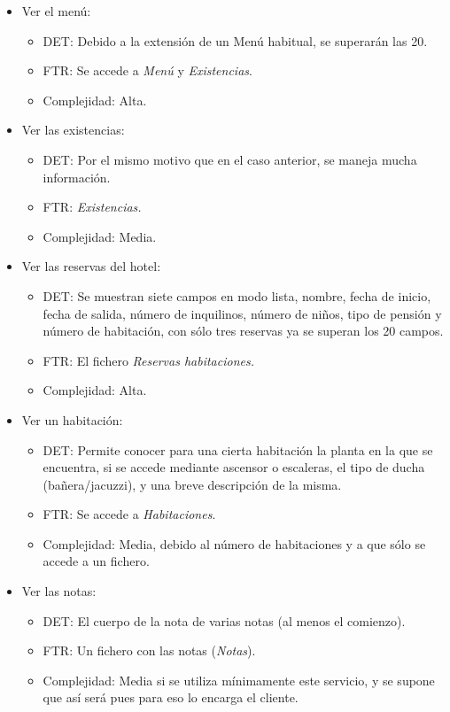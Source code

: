 \documentclass[spanish,a4paper,11pt, twoside]{report}	%
\begin{document}
\begin{itemize}
		\item{Ver el menú:} 
		\begin{itemize}
 			\item{DET:} Debido a la extensión de un Menú habitual, se superarán las 20.
			\item{FTR:} Se accede a \textit{Menú} y \textit{Existencias}.
			\item{Complejidad:} Alta.
		\end{itemize}
		\item{Ver las existencias:} 
		\begin{itemize}
 			\item{DET:} Por el mismo motivo que en el caso anterior, se maneja mucha información.
			\item{FTR:} \textit{Existencias.}
			\item{Complejidad:} Media.
		\end{itemize}
		\item{Ver las reservas del hotel:} 
		\begin{itemize}
 			\item{DET:} Se muestran siete campos en modo lista, nombre, fecha de inicio, fecha de salida, número de inquilinos, número de niños, tipo de pensión y número de habitación, con sólo tres reservas ya se superan los 20 campos.
			\item{FTR:} El fichero \textit{Reservas habitaciones.}
			\item{Complejidad:} Alta.	
		\end{itemize}		
		\item{Ver un habitación:} 
		\begin{itemize}
 			\item{DET:} Permite conocer para una cierta habitación la planta en la que se encuentra, si se accede mediante ascensor o escaleras, el tipo de ducha (bañera/jacuzzi), y una breve descripción de la misma.
			\item{FTR:} Se accede a \textit{Habitaciones}.
			\item{Complejidad:} Media, debido al número de habitaciones y a que sólo se accede a un fichero.
		\end{itemize}
		\item{Ver las notas:} 
		\begin{itemize}
 			\item{DET:} El cuerpo de la nota  de varias notas (al menos el comienzo).
			\item{FTR:} Un fichero con las notas (\textit{Notas}).
			\item{Complejidad:} Media si se utiliza mínimamente este servicio, y se supone que así será pues para eso lo encarga el cliente.

\end{itemize}
\end{itemize}
\end{document}
